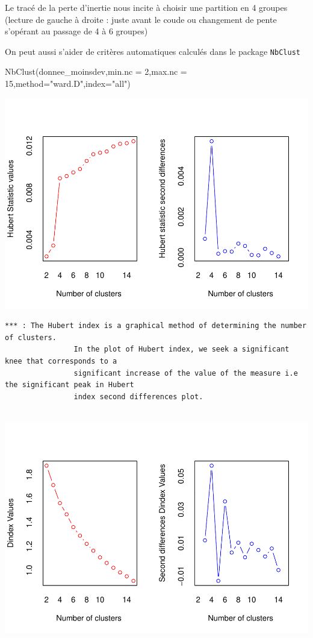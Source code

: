 \documentclass[
]{article}
\newenvironment{Shaded}{}{}
\newcommand{\AttributeTok}[1]{#1}
\newcommand{\DecValTok}[1]{#1}
\newcommand{\FunctionTok}[1]{#1}
\newcommand{\NormalTok}[1]{#1}
\newcommand{\StringTok}[1]{\textcolor[rgb]{0.00,0.50,0.50}{#1}}
\begin{document}
Le tracé de la perte d'inertie nous incite à choisir une partition en 4
groupes (lecture de gauche à droite : juste avant le coude ou changement
de pente s'opérant au passage de 4 à 6 groupes)

On peut aussi s'aider de critères automatiques calculés dans le package
\texttt{NbClust}

\begin{Shaded}
\begin{Highlighting}[]
\FunctionTok{NbClust}\NormalTok{(donnee\_moinsdev,}\AttributeTok{min.nc =} \DecValTok{2}\NormalTok{,}\AttributeTok{max.nc =} \DecValTok{15}\NormalTok{,}\AttributeTok{method=}\StringTok{"ward.D"}\NormalTok{,}\AttributeTok{index=}\StringTok{"all"}\NormalTok{)}
\end{Highlighting}
\end{Shaded}

\includegraphics{Projet_files/figure-latex/unnamed-chunk-32-1.pdf}

\begin{verbatim}
*** : The Hubert index is a graphical method of determining the number of clusters.
                In the plot of Hubert index, we seek a significant knee that corresponds to a 
                significant increase of the value of the measure i.e the significant peak in Hubert
                index second differences plot. 
 
\end{verbatim}

\includegraphics{Projet_files/figure-latex/unnamed-chunk-32-2.pdf}
\end{document}
